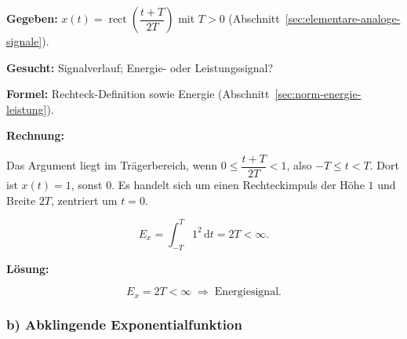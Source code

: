 \begin{beispiel}

\textbf{Gegeben:} $x(t) = \operatorname{rect}\!\left(\dfrac{t + T}{2T}\right)$
mit $T > 0$ (Abschnitt~\ref{sec:elementare-analoge-signale}).

\textbf{Gesucht:} Signalverlauf; Energie- oder Leistungssignal?

\textbf{Formel:} Rechteck-Definition sowie Energie
(Abschnitt~\ref{sec:norm-energie-leistung}).

\textbf{Rechnung:}

Das Argument liegt im Trägerbereich, wenn
$0 \leq \dfrac{t+T}{2T} < 1$, also $-T \leq t < T$. Dort ist $x(t) = 1$, sonst
$0$. Es handelt sich um einen Rechteckimpuls der Höhe $1$ und Breite $2T$,
zentriert um $t = 0$.

$$
E_x = \int_{-T}^{T} 1^2\,\mathrm{d}t = 2T < \infty.
$$

\begin{center}
\end{center}

\textbf{Lösung:}

$$
\boxed{\;E_x = 2T < \infty \;\Rightarrow\; \text{Energiesignal.}\;}
$$

\end{beispiel}

\subsubsection*{b) Abklingende Exponentialfunktion}

